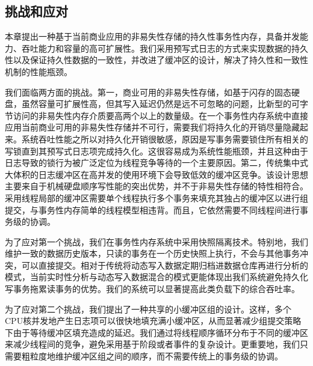 \subsection{挑战和应对}

本章提出一种基于当前商业应用的非易失性存储的持久性事务性内存，具备并发能力、吞吐能力和容量的高可扩展性。我们采用预写式日志的方式来实现数据的持久性以及保证持久性数据的一致性，并改进了缓冲区的设计，解决了持久性和一致性机制的性能瓶颈。

我们面临两方面的挑战。第一，商业可用的非易失性存储，如基于闪存的固态硬盘，虽然容量可扩展性高，但其写入延迟仍然是远不可忽略的问题，比新型的可字节访问的非易失性内存介质要高两个以上的数量级。在一个事务性内存系统中直接应用当前商业可用的非易失性存储并不可行，需要我们将持久化的开销尽量隐藏起来。系统吞吐性能之所以对持久化开销很敏感，原因是写事务需要锁住所有相关的写锁直到其预写式日志项完成持久化。这很容易成为系统性能瓶颈\cite{Chen:2009:FEF:1559845.1559855,
Johnson:2010:ASA:1920841.1920928, Johnson:2012:SWL:2205457.2205463,
Zheng:2014:FDF:2685048.2685085}，并且这种由于日志导致的锁行为\cite{Johnson:2010:ASA:1920841.1920928}被广泛定位为线程竞争等待的一个主要原因。第二，传统集中式大体积的日志缓冲区在高并发的使用环境下会导致低效的缓冲区竞争\cite{Johnson:2010:ASA:1920841.1920928,
Huang:2014:NLT:2735496.2735502}。该设计思想主要来自于机械硬盘顺序写性能的突出优势，并不于非易失性存储的特性相符合。采用线程局部的缓冲区\cite{Johnson:2012:SWL:2205457.2205463,
Zheng:2014:FDF:2685048.2685085, Wang:2014:SLT:2732951.2732960}需要单个线程执行多个事务来填充其独占的缓冲区以进行组提交，与事务性内存简单的线程模型相违背。而且，它依然需要不同线程间进行事务级的协调\cite{Johnson:2012:SWL:2205457.2205463,Wang:2014:SLT:2732951.2732960}。

为了应对第一个挑战，我们在事务性内存系统中采用快照隔离技术。特别地，我们维护一致的数据历史版本，只读的事务在一个历史快照上执行，不会与其他事务冲突，可以直接提交。相对于传统将动态写入数据定期归档进数据仓库再进行分析的模式，当前实时性分析与动态写入数据混合的模式\cite{ren2011querying,
Cheng:2012:KTP:2168836.2168846,4302625,Corbett:2012:SGG:2387880.2387905}更能体现出我们系统避免持久化写事务拖累读事务的优势。我们的系统可以显著提高此类负载下的综合吞吐率。

为了应对第二个挑战，我们提出了一种共享的小缓冲区组的设计。这样，多个CPU核并发地产生日志项可以很快地填充满小缓冲区，从而显著减少组提交策略下由于等待缓冲区填充造成的延迟。我们通过将线程顺序循环分布于不同的缓冲区来减少线程间的竞争，避免采用基于阶段或者事件的复杂设计。更重要地，我们只需要粗粒度地维护缓冲区组之间的顺序，而不需要传统上的事务级的协调。

